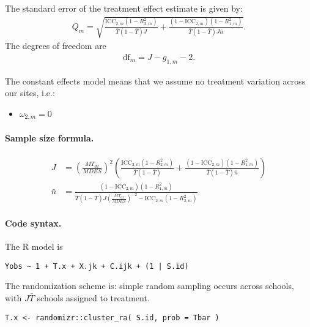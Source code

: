 \documentclass[12pt]{article}
\begin{document}
The standard error of the treatment effect estimate is given by:
\begin{align}
Q_m = \sqrt{\frac{\text{ICC}_{2,m}(1 - R^2_{2,m})}{\bar{T}(1 - \bar{T}) J} + \frac{(1-\text{ICC}_{2,m})(1-R^2_{1,m})}{\bar{T}(1 - \bar{T}) J \bar{n}}}.\end{align}
The degrees of freedom are
\begin{align}\text{df}_m = J - g_{1,m} - 2.\end{align}

The constant effects model means that we assume no treatment variation across our sites, i.e.:
\begin{itemize}
\item $\omega_{2,m} = 0$
\end{itemize}


\paragraph{Sample size formula.} 
\begin{align}
J &= \left(\frac{MT_{df}}{MDES}\right)^2 \left(\frac{\text{ICC}_{2,m}(1-R^2_{2,m})}{\bar{T}(1- \bar{T})} + \frac{(1-\text{ICC}_{2,m})(1-R^2_{1,m})}{\bar{T}(1 - \bar{T}) \bar{n}} \right)\\
\bar{n} &= \frac{(1-\text{ICC}_{2,m})(1-R^2_{1,m})}{\bar{T}(1 - \bar{T}) J \left(\frac{MT_{df}}{MDES}\right)^{-2} - \text{ICC}_{2,m}(1-R^2_{2,m})  }
\end{align}


\paragraph{Code syntax.}
The R model is
\begin{verbatim}
Yobs ~ 1 + T.x + X.jk + C.ijk + (1 | S.id)
\end{verbatim}

The randomization scheme is: simple random sampling occurs across schools, with $J\bar{T}$ schools assigned to treatment.
\begin{verbatim}
T.x <- randomizr::cluster_ra( S.id, prob = Tbar )
\end{verbatim}



\newpage 
\end{document}
